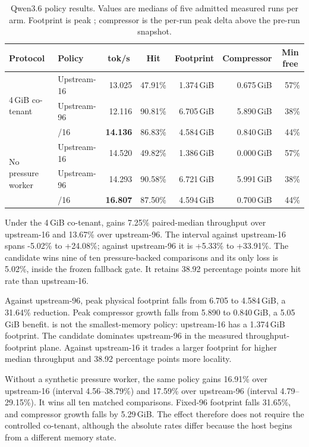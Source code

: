 \begin{table}[ht]
\centering
\caption{Qwen3.6 policy results. Values are medians of five admitted measured
runs per arm. Footprint is peak ; compressor is the
per-run peak delta above the pre-run snapshot.}
\label{tab:qwen}
\small
\begin{tabular}{llrrrrr}
\toprule
Protocol & Policy & \multicolumn{1}{c}{tok/s} & \multicolumn{1}{c}{Hit} &
\multicolumn{1}{c}{Footprint} & \multicolumn{1}{c}{Compressor} &
\multicolumn{1}{c}{Min free} \\
\midrule
\multirow{3}{*}{4\,GiB co-tenant}
 & Upstream-16 & 13.025 & 47.91\% & 1.374\,GiB & 0.675\,GiB & 57\% \\
 & Upstream-96 & 12.116 & 90.81\% & 6.705\,GiB & 5.890\,GiB & 38\% \\
 & \system-96/16 & \textbf{14.136} & 86.83\% & 4.584\,GiB & 0.840\,GiB & 44\% \\
\midrule
\multirow{3}{*}{No pressure worker}
 & Upstream-16 & 14.520 & 49.82\% & 1.386\,GiB & 0.000\,GiB & 57\% \\
 & Upstream-96 & 14.293 & 90.58\% & 6.721\,GiB & 5.991\,GiB & 38\% \\
 & \system-96/16 & \textbf{16.807} & 87.50\% & 4.594\,GiB & 0.700\,GiB & 44\% \\
\bottomrule
\end{tabular}
\end{table}

Under the 4\,GiB co-tenant, \system gains 7.25\% paired-median throughput over
upstream-16 and 13.67\% over upstream-96. The interval against upstream-16
spans -5.02\% to +24.08\%; against upstream-96 it is +5.33\% to +33.91\%.
The candidate wins nine of ten pressure-backed comparisons and its only loss is
5.02\%, inside the frozen fallback gate. It retains 38.92 percentage points
more hit rate than upstream-16.

Against upstream-96, peak physical footprint falls from 6.705 to 4.584\,GiB,
a 31.64\% reduction. Peak compressor growth falls from 5.890 to 0.840\,GiB, a
5.05\,GiB benefit. \system is not the smallest-memory policy: upstream-16 has
a 1.374\,GiB footprint. The candidate dominates upstream-96 in the measured
throughput-footprint plane. Against upstream-16 it trades a larger footprint
for higher median throughput and 38.92 percentage points more locality.

Without a synthetic pressure worker, the same policy gains 16.91\% over
upstream-16 (interval 4.56--38.79\%) and 17.59\% over upstream-96 (interval
4.79--29.15\%). It wins all ten matched comparisons. Fixed-96 footprint falls
31.65\%, and compressor growth falls by 5.29\,GiB. The effect therefore does
not require the controlled co-tenant, although the absolute rates differ
because the host begins from a different memory state.


